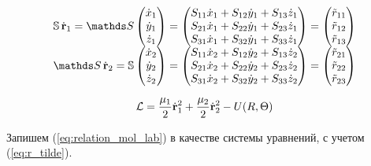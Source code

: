\begin{equation}
\label{eq:r_tilde}
\begin{array}{c}
\mathbb{S} \, \dot{\mf{r}}_1 = \bbS \left(\begin{matrix}
\dot{x}_1\\
\dot{y}_1\\
\dot{z}_1
\end{matrix}\right)  =
\left(\begin{matrix}
S_{11}\dot{x}_1 + S_{12}\dot{y}_1 + S_{13}\dot{z}_1 \\
S_{21}\dot{x}_1 + S_{22}\dot{y}_1 + S_{23}\dot{z}_1\\
S_{31}\dot{x}_1 + S_{32}\dot{y}_1 + S_{33}\dot{z}_1
\end{matrix}\right)
=  \left(\begin{matrix}
\tilde{r}_{11}\\
\tilde{r}_{12}\\
\tilde{r}_{13}
\end{matrix}\right)
\\
\bbS \, \dot{\mf{r}}_2 = \mathbb{S}\left(\begin{matrix}
\dot{x}_2\\
\dot{y}_2\\
\dot{z}_2
\end{matrix}\right)  =
\left(\begin{matrix}
S_{11}\dot{x}_2 + S_{12}\dot{y}_2 + S_{13}\dot{z}_2 \\
S_{21}\dot{x}_2 + S_{22}\dot{y}_2 + S_{23}\dot{z}_2\\
S_{31}\dot{x}_2 + S_{32}\dot{y}_2 + S_{33}\dot{z}_2
\end{matrix}\right)= \left(\begin{matrix}
\tilde{r}_{21}\\
\tilde{r}_{22}\\
\tilde{r}_{23}
\end{matrix}\right) 
\end{array}
\end{equation}

\begin{equation}
\mathcal{L} = \frac{\mu_1}{2}\dot{\mathbf{r}}_1^2 + \frac{\mu_2}{2}\dot{\mathbf{r}}_2^2 - U(R,\Theta)
\end{equation}

Запишем (\ref{eq:relation_mol_lab}) в качестве системы уравнений, с учетом (\ref{eq:r_tilde}).

